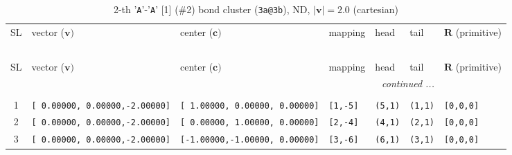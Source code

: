 \documentclass[fleqn,10pt,landscape]{jsarticle}
\begin{document}
\begin{longtable}[l]{cllllll}
\captionsetup{justification=raggedright, singlelinecheck=off}
\caption{2-th '\texttt{A}'-'\texttt{A}' [1] (\#2) bond cluster (\texttt{3a@3b}), ND, $|\bm{v}|=2.0$ (cartesian)}
 \\
 \hline \hline
SL & vector ($\bm{v})$ & center ($\bm{c})$ & mapping & head & tail & $\bm{R}$ (primitive) \\ \hline \endfirsthead

\multicolumn{6}{l}{\tablename\ \thetable{}} \\
 \hline \hline
SL & vector ($\bm{v})$ & center ($\bm{c})$ & mapping & head & tail & $\bm{R}$ (primitive) \\ \hline \endhead

 \hline \hline
\multicolumn{6}{r}{\footnotesize\it continued ...} \\ \endfoot

 \hline \hline
\multicolumn{6}{r}{} \\ \endlastfoot

1 & \texttt{[ 0.00000, 0.00000,-2.00000]} & \texttt{[ 1.00000, 0.00000, 0.00000]} & \texttt{[1,-5]} & \texttt{(5,1)} & \texttt{(1,1)} & \texttt{[0,0,0]} \\ \hline
2 & \texttt{[ 0.00000, 0.00000,-2.00000]} & \texttt{[ 0.00000, 1.00000, 0.00000]} & \texttt{[2,-4]} & \texttt{(4,1)} & \texttt{(2,1)} & \texttt{[0,0,0]} \\ \hline
3 & \texttt{[ 0.00000, 0.00000,-2.00000]} & \texttt{[-1.00000,-1.00000, 0.00000]} & \texttt{[3,-6]} & \texttt{(6,1)} & \texttt{(3,1)} & \texttt{[0,0,0]} \\
\end{longtable}
\end{document}
